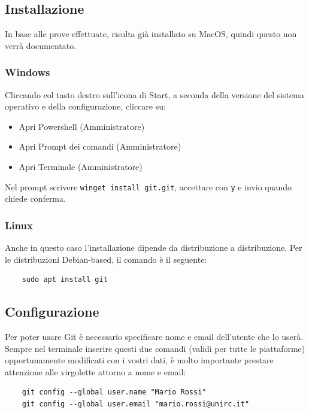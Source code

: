 \documentclass[envcountsame,envcountchap]{svmono}
\begin{document}
\subsection{Installazione \citep{installGit}}
In base alle prove effettuate, risulta già installato su MacOS, 
quindi questo non verrà documentato.
\subsubsection{Windows}
Cliccando col tasto destro sull'icona di Start, a seconda della versione del 
sistema operativo e della configurazione, cliccare su:
\begin{itemize}
    \item Apri Powershell (Amministratore)
    \item Apri Prompt dei comandi (Amministratore)
    \item Apri Terminale (Amministratore)
\end{itemize}
Nel prompt scrivere {\tt winget install git.git}, accettare con {\tt y} 
e invio quando chiede conferma.

\subsubsection{Linux}
Anche in questo caso l'installazione dipende da distribuzione a distribuzione. 
Per le distribuzioni Debian-based, il comando è il seguente:
\begin{verbatim}
    sudo apt install git
\end{verbatim}

\subsection{Configurazione}
Per poter usare Git è necessario specificare nome e email dell'utente che lo userà.
Sempre nel terminale inserire questi due comandi (validi per tutte le piattaforme)
opportunamente modificati con i vostri dati, è molto importante prestare attenzione
alle virgolette attorno a nome e email:
\begin{verbatim}
    git config --global user.name "Mario Rossi"
    git config --global user.email "mario.rossi@unirc.it"
\end{verbatim}
\end{document}
